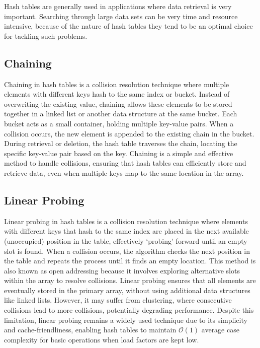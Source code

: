\documentclass[a4paper,9pt]{article}
\begin{document}
\noindent Hash tables are generally used in applications where data retrieval is very important. Searching through large data sets can be very time and resource intensive, because of the nature of hash 
tables they tend to be an optimal choice for tackling such problems.

\subsection*{Chaining}

Chaining in hash tables is a collision resolution technique where multiple elements with different keys hash to the same index or bucket. Instead of overwriting the existing value, chaining allows these elements 
to be stored together in a linked list or another data structure at the same bucket. Each bucket acts as a small container, holding multiple key-value pairs. When a collision occurs, the new element is appended 
to the existing chain in the bucket. During retrieval or deletion, the hash table traverses the chain, locating the specific key-value pair based on the key. Chaining is a simple and effective method to handle 
collisions, ensuring that hash tables can efficiently store and retrieve data, even when multiple keys map to the same location in the array.

\subsection*{Linear Probing}

Linear probing in hash tables is a collision resolution technique where elements with different keys that hash to the same index are placed in the next available (unoccupied) position in the table, effectively 
`probing' forward until an empty slot is found. When a collision occurs, the algorithm checks the next position in the table and repeats the process until it finds an empty location. This method is also known as 
open addressing because it involves exploring alternative slots within the array to resolve collisions. Linear probing ensures that all elements are eventually stored in the primary array, without using additional 
data structures like linked lists. However, it may suffer from clustering, where consecutive collisions lead to more collisions, potentially degrading performance. Despite this limitation, linear probing remains 
a widely used technique due to its simplicity and cache-friendliness, enabling hash tables to maintain $\mathcal{O}(1)$ average case complexity for basic operations when load factors are kept low.
\end{document}

